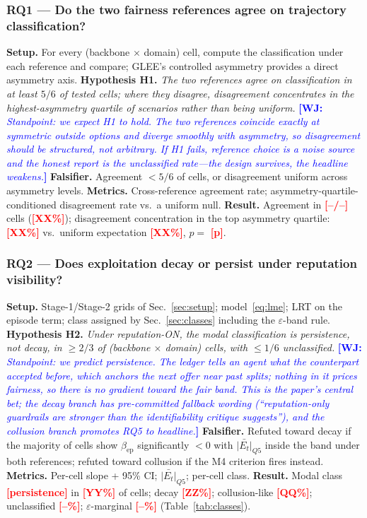 \documentclass[conference]{IEEEtran}
\newcommand{\wj}[1]{\textcolor{blue}{\textbf{[WJ:} \textit{#1}\textbf{]}}}
\newcommand{\ph}[1]{\textcolor{red}{\textbf{[#1]}}}
\newcommand{\Et}{E_t}
\newcommand{\eps}{\varepsilon}
\begin{document}
\subsubsection*{RQ1 --- Do the two fairness references agree on trajectory
classification?}
\textbf{Setup.} For every (backbone $\times$ domain) cell, compute the
classification under each reference and compare; GLEE's controlled asymmetry
provides a direct asymmetry axis.
\textbf{Hypothesis H1.} \emph{The two references agree on classification in at
least $5/6$ of tested cells; where they disagree, disagreement concentrates in
the highest-asymmetry quartile of scenarios rather than being uniform.}
\wj{Standpoint: we expect H1 to hold. The two references coincide exactly at
symmetric outside options and diverge smoothly with asymmetry, so
disagreement should be structured, not arbitrary. If H1 fails, reference
choice is a noise source and the honest report is the unclassified rate---the
design survives, the headline weakens.}
\textbf{Falsifier.} Agreement $< 5/6$ of cells, or disagreement uniform
across asymmetry levels.
\textbf{Metrics.} Cross-reference agreement rate; asymmetry-quartile-conditioned
disagreement rate vs.\ a uniform null.
\textbf{Result.} Agreement in \ph{--/--} cells (\ph{XX\%}); disagreement
concentration in the top asymmetry quartile: \ph{XX\%} vs.\ uniform
expectation \ph{XX\%}, $p = $ \ph{p}.

\subsubsection*{RQ2 --- Does exploitation decay or persist under reputation
visibility?}
\textbf{Setup.} Stage-1/Stage-2 grids of Sec.~\ref{sec:setup};
model~\eqref{eq:lme}; LRT on the episode term; class assigned by
Sec.~\ref{sec:classes} including the $\eps$-band rule.
\textbf{Hypothesis H2.} \emph{Under reputation-ON, the modal classification is
persistence, not decay, in $\geq 2/3$ of (backbone $\times$ domain) cells,
with $\leq 1/6$ unclassified.}
\wj{Standpoint: we predict persistence. The ledger tells an agent what the
counterpart accepted before, which anchors the next offer near past splits;
nothing in it prices fairness, so there is no gradient toward the fair band.
This is the paper's central bet; the decay branch has pre-committed fallback
wording (``reputation-only guardrails are stronger than the identifiability
critique suggests''), and the collusion branch promotes RQ5 to headline.}
\textbf{Falsifier.} Refuted toward decay if the majority of cells show
$\beta_{\mathrm{ep}}$ significantly $<0$ with $\bar{|\Et|}_{Q5}$ inside the
band under both references; refuted toward collusion if the M4 criterion
fires instead.
\textbf{Metrics.} Per-cell slope + 95\% CI; $\bar{|\Et|}_{Q5}$; per-cell class.
\textbf{Result.} Modal class \ph{persistence} in \ph{YY\%} of cells; decay
\ph{ZZ\%}; collusion-like \ph{QQ\%}; unclassified \ph{--\%};
$\eps$-marginal \ph{--\%} (Table~\ref{tab:classes}).
\end{document}
